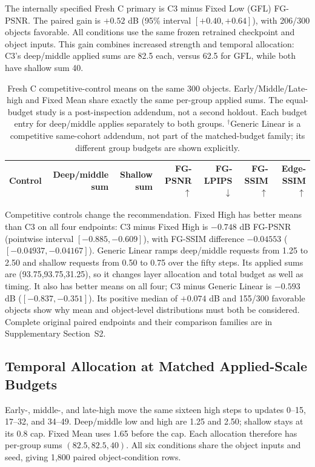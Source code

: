\documentclass[times,twocolumn,final]{elsarticle}
\begin{document}
The internally specified Fresh C primary is C3 minus Fixed Low (GFL) FG-PSNR. The paired gain is $+0.52$ dB (95\% interval $[+0.40,+0.64]$), with 206/300 objects favorable. All conditions use the same frozen retrained checkpoint and object inputs. This gain combines increased strength and temporal allocation: C3's deep/middle applied sums are 82.5 each, versus 62.5 for GFL, while both have shallow sum 40.

\begin{table}[t]
\centering\scriptsize\setlength{\tabcolsep}{4pt}
\caption{Fresh C competitive-control means on the same 300 objects. Early/Middle/Late-high and Fixed Mean share exactly the same per-group applied sums. The equal-budget study is a post-inspection addendum, not a second holdout. Each budget entry for deep/middle applies separately to both groups. $^\dagger$Generic Linear is a competitive same-cohort addendum, not part of the matched-budget family; its different group budgets are shown explicitly.}
\label{tab:freshc-absolute}\label{tab:matched-budget300}
\begin{tabular}{lrrrrrr}
\toprule Control & Deep/middle sum & Shallow sum & FG-PSNR$\uparrow$ & FG-LPIPS$\downarrow$ & FG-SSIM$\uparrow$ & Edge-SSIM$\uparrow$ \\
\midrule

\bottomrule
\end{tabular}
\end{table}

Competitive controls change the recommendation. Fixed High has better means than C3 on all four endpoints: C3 minus Fixed High is $-0.748$ dB FG-PSNR (pointwise interval $[-0.885,-0.609]$), with FG-SSIM difference $-0.04553$ ($[-0.04937,-0.04167]$). Generic Linear ramps deep/middle requests from 1.25 to 2.50 and shallow requests from 0.50 to 0.75 over the fifty steps. Its applied sums are (93.75,93.75,31.25), so it changes layer allocation and total budget as well as timing. It also has better means on all four; C3 minus Generic Linear is $-0.593$ dB ($[-0.837,-0.351]$). Its positive median of $+0.074$ dB and 155/300 favorable objects show why mean and object-level distributions must both be considered. Complete original paired endpoints and their comparison families are in Supplementary Section~S2.

\subsection{Temporal Allocation at Matched Applied-Scale Budgets}
\label{subsec:matched-budget300}
Early-, middle-, and late-high move the same sixteen high steps to updates 0--15, 17--32, and 34--49. Deep/middle low and high are 1.25 and 2.50; shallow stays at its 0.8 cap. Fixed Mean uses 1.65 before the cap. Each allocation therefore has per-group sums $(82.5,82.5,40)$. All six conditions share the object inputs and seed, giving 1,800 paired object-condition rows.
\end{document}
